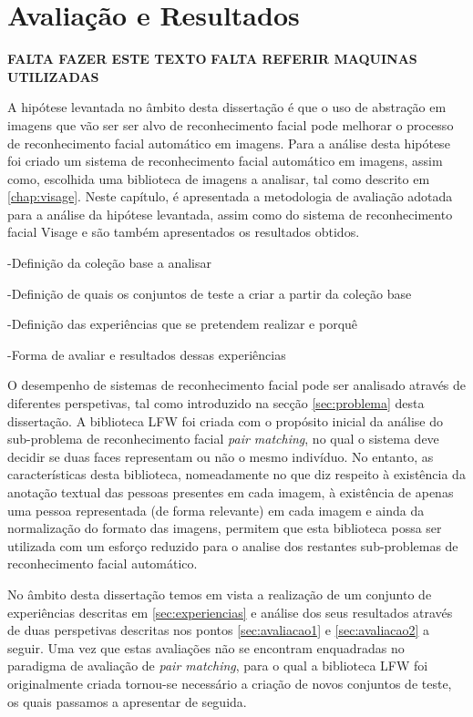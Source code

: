 \chapter{Avaliação e Resultados} \label{chap:resultados}
\textbf{FALTA FAZER ESTE TEXTO}
\textbf{FALTA REFERIR MAQUINAS UTILIZADAS}

A hipótese levantada no âmbito desta dissertação é que o uso de abstração em imagens que vão ser ser alvo de reconhecimento facial pode melhorar o processo de reconhecimento facial automático em imagens. Para a análise desta hipótese foi criado um sistema de reconhecimento facial automático em imagens, assim  como, escolhida uma biblioteca de imagens a analisar, tal como descrito em \ref{chap:visage}. Neste capítulo, é apresentada a metodologia de avaliação adotada para a análise da hipótese levantada, assim como do sistema de reconhecimento facial Visage e são também apresentados os resultados obtidos.



-Definição da coleção base a analisar

-Definição de quais os conjuntos de teste a criar a partir da coleção base

-Definição das experiências que se pretendem realizar e porquê

-Forma de avaliar e resultados dessas experiências

O desempenho de sistemas de reconhecimento facial pode ser analisado através de diferentes perspetivas, tal como introduzido na secção \ref{sec:problema} desta dissertação. A biblioteca LFW foi criada com o propósito inicial da análise do sub-problema de reconhecimento facial \textit{pair matching}, no qual o sistema deve decidir se duas faces representam ou não o mesmo indivíduo. No entanto, as características desta biblioteca, nomeadamente no que diz respeito à existência da anotação textual das pessoas presentes em cada imagem, à existência de apenas uma pessoa representada (de forma relevante) em cada imagem e ainda da normalização do formato das imagens, permitem que esta biblioteca possa ser utilizada com um esforço reduzido para o analise dos restantes sub-problemas de reconhecimento facial automático.

No âmbito desta dissertação temos em vista a realização de um conjunto de experiências descritas em \ref{sec:experiencias} e análise dos seus resultados através de duas perspetivas descritas nos pontos \ref{sec:avaliacao1} e \ref{sec:avaliacao2} a seguir. Uma vez que estas avaliações não se encontram enquadradas no paradigma de avaliação de \textit{pair matching}, para o qual a biblioteca LFW foi originalmente criada tornou-se necessário a criação de novos conjuntos de teste, os quais passamos a apresentar de seguida.

